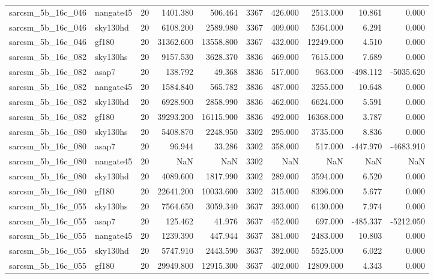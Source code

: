\documentclass{article}
\begin{document}
\begin{longtable}{llrrrrrrrr}
sarcsm\_5b\_16c\_046 & nangate45 & 20 & 1401.380 & 506.464 & 3367 & 426.000 & 2513.000 & 10.861 & 0.000 \\
sarcsm\_5b\_16c\_046 & sky130hd & 20 & 6108.200 & 2589.980 & 3367 & 409.000 & 5364.000 & 6.291 & 0.000 \\
sarcsm\_5b\_16c\_046 & gf180 & 20 & 31362.600 & 13558.800 & 3367 & 432.000 & 12249.000 & 4.510 & 0.000 \\
sarcsm\_5b\_16c\_082 & sky130hs & 20 & 9157.530 & 3628.370 & 3836 & 469.000 & 7615.000 & 7.689 & 0.000 \\
sarcsm\_5b\_16c\_082 & asap7 & 20 & 138.792 & 49.368 & 3836 & 517.000 & 963.000 & -498.112 & -5035.620 \\
sarcsm\_5b\_16c\_082 & nangate45 & 20 & 1584.840 & 565.782 & 3836 & 487.000 & 3255.000 & 10.648 & 0.000 \\
sarcsm\_5b\_16c\_082 & sky130hd & 20 & 6928.900 & 2858.990 & 3836 & 462.000 & 6624.000 & 5.591 & 0.000 \\
sarcsm\_5b\_16c\_082 & gf180 & 20 & 39293.200 & 16115.900 & 3836 & 492.000 & 16368.000 & 3.787 & 0.000 \\
sarcsm\_5b\_16c\_080 & sky130hs & 20 & 5408.870 & 2248.950 & 3302 & 295.000 & 3735.000 & 8.836 & 0.000 \\
sarcsm\_5b\_16c\_080 & asap7 & 20 & 96.944 & 33.286 & 3302 & 358.000 & 517.000 & -447.970 & -4683.910 \\
sarcsm\_5b\_16c\_080 & nangate45 & 20 & NaN & NaN & 3302 & NaN & NaN & NaN & NaN \\
sarcsm\_5b\_16c\_080 & sky130hd & 20 & 4089.600 & 1817.990 & 3302 & 289.000 & 3594.000 & 6.520 & 0.000 \\
sarcsm\_5b\_16c\_080 & gf180 & 20 & 22641.200 & 10033.600 & 3302 & 315.000 & 8396.000 & 5.677 & 0.000 \\
sarcsm\_5b\_16c\_055 & sky130hs & 20 & 7564.650 & 3059.340 & 3637 & 393.000 & 6130.000 & 7.974 & 0.000 \\
sarcsm\_5b\_16c\_055 & asap7 & 20 & 125.462 & 41.976 & 3637 & 452.000 & 697.000 & -485.337 & -5212.050 \\
sarcsm\_5b\_16c\_055 & nangate45 & 20 & 1239.390 & 447.944 & 3637 & 381.000 & 2483.000 & 10.803 & 0.000 \\
sarcsm\_5b\_16c\_055 & sky130hd & 20 & 5747.910 & 2443.590 & 3637 & 392.000 & 5525.000 & 6.022 & 0.000 \\
sarcsm\_5b\_16c\_055 & gf180 & 20 & 29949.800 & 12915.300 & 3637 & 402.000 & 12809.000 & 4.343 & 0.000 \\

\end{longtable}
\end{document}
